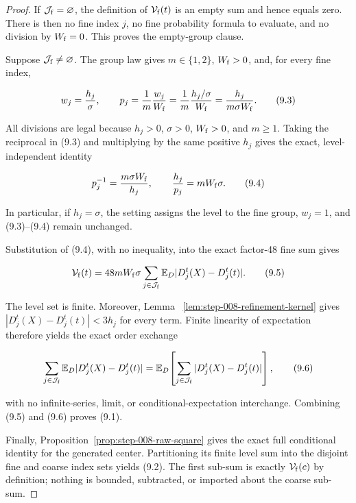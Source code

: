 \begin{proof}
If \(\mathcal J_{\rm f}=\varnothing\), the
definition of \(\mathcal V_{\rm f}(t)\) is an empty sum and hence equals zero.
There is then no fine index \(j\), no fine probability formula to evaluate,
and no division by \(W_{\rm f}=0\). This proves the empty-group clause.

Suppose \(\mathcal J_{\rm f}\neq\varnothing\). The group law gives
\(m\in\{1,2\}\), \(W_{\rm f}>0\), and, for every fine index,

\[
w_j=\frac{h_j}{\sigma},
\qquad
p_j=\frac1m\frac{w_j}{W_{\rm f}}
=\frac1m\frac{h_j/\sigma}{W_{\rm f}}
=\frac{h_j}{m\sigma W_{\rm f}}.
\tag{9.3}
\]

All divisions are legal because \(h_j>0\), \(\sigma>0\),
\(W_{\rm f}>0\), and \(m\geq1\). Taking the reciprocal in (9.3) and
multiplying by the same positive \(h_j\) gives the exact, level-independent
identity

\[
p_j^{-1}=\frac{m\sigma W_{\rm f}}{h_j},
\qquad
\frac{h_j}{p_j}=mW_{\rm f}\sigma.
\tag{9.4}
\]

In particular, if \(h_j=\sigma\), the setting assigns the level to the fine
group, \(w_j=1\), and (9.3)--(9.4) remain unchanged.

Substitution of (9.4), with no inequality, into the exact factor-48 fine sum
gives

\[
\mathcal V_{\rm f}(t)
=48mW_{\rm f}\sigma
\sum_{j\in\mathcal J_{\rm f}}
\mathbb E_D|D_j^t(X)-D_j^t(t)|.
\tag{9.5}
\]

The level set is finite. Moreover, Lemma~
\ref{lem:step-008-refinement-kernel} gives
\(|D_j^t(X)-D_j^t(t)|<3h_j\) for every term. Finite linearity of
expectation therefore yields the exact order exchange

\[
\sum_{j\in\mathcal J_{\rm f}}
\mathbb E_D|D_j^t(X)-D_j^t(t)|
=\mathbb E_D\!\left[
\sum_{j\in\mathcal J_{\rm f}}
|D_j^t(X)-D_j^t(t)|
\right],
\tag{9.6}
\]

with no infinite-series, limit, or conditional-expectation interchange.
Combining (9.5) and (9.6) proves (9.1).

Finally, Proposition~\ref{prop:step-008-raw-square} gives the exact full
conditional identity for the generated center. Partitioning its finite level
sum into the disjoint fine and coarse index sets yields (9.2). The first
sub-sum is exactly \(\mathcal V_{\rm f}(c)\) by definition; nothing is
bounded, subtracted, or imported about the coarse sub-sum.
\end{proof}

